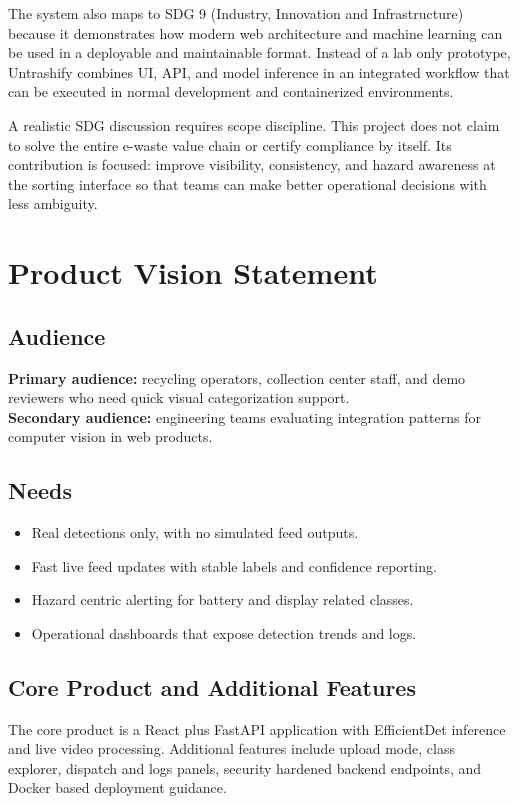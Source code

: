 \documentclass[12pt,a4paper]{report}
\begin{document}
The system also maps to SDG 9 (Industry, Innovation and Infrastructure) because it demonstrates how modern web architecture and machine learning can be used in a deployable and maintainable format. Instead of a lab only prototype, Untrashify combines UI, API, and model inference in an integrated workflow that can be executed in normal development and containerized environments.

A realistic SDG discussion requires scope discipline. This project does not claim to solve the entire e-waste value chain or certify compliance by itself. Its contribution is focused: improve visibility, consistency, and hazard awareness at the sorting interface so that teams can make better operational decisions with less ambiguity.

\section{Product Vision Statement}
\subsection{Audience}
\textbf{Primary audience:} recycling operators, collection center staff, and demo reviewers who need quick visual categorization support.\\
\textbf{Secondary audience:} engineering teams evaluating integration patterns for computer vision in web products.

\subsection{Needs}
\begin{itemize}
    \item Real detections only, with no simulated feed outputs.
    \item Fast live feed updates with stable labels and confidence reporting.
    \item Hazard centric alerting for battery and display related classes.
    \item Operational dashboards that expose detection trends and logs.
\end{itemize}

\subsection{Core Product and Additional Features}
The core product is a React plus FastAPI application with EfficientDet inference and live video processing. Additional features include upload mode, class explorer, dispatch and logs panels, security hardened backend endpoints, and Docker based deployment guidance.
\end{document}

